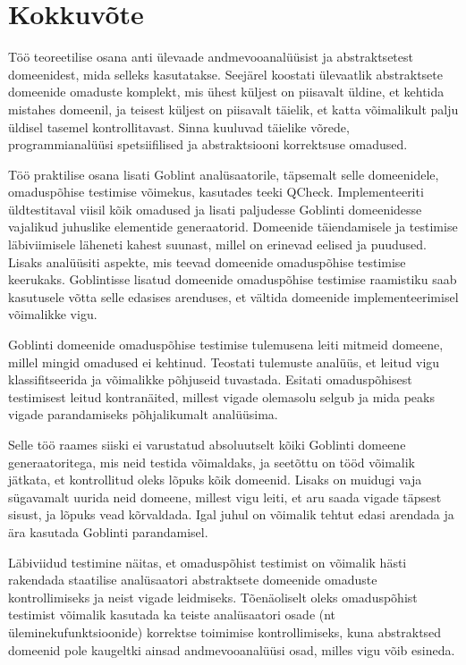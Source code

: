 \documentclass[../thesis.tex]{subfiles}
\begin{document}
\section{Kokkuvõte}
Töö teoreetilise osana anti ülevaade andmevooanalüüsist ja abstraktsetest domeenidest, mida selleks kasutatakse. Seejärel koostati ülevaatlik abstraktsete domeenide omaduste komplekt, mis ühest küljest on piisavalt üldine, et kehtida mistahes domeenil, ja teisest küljest on piisavalt täielik, et katta võimalikult palju üldisel tasemel kontrollitavast. Sinna kuuluvad täielike võrede, programmianalüüsi spetsiifilised ja abstraktsiooni korrektsuse omadused.

Töö praktilise osana lisati Goblint analüsaatorile, täpsemalt selle domeenidele, omaduspõhise testimise võimekus, kasutades teeki QCheck. Implementeeriti üldtestitaval viisil kõik omadused ja lisati paljudesse Goblinti domeenidesse vajalikud juhuslike elementide generaatorid. Domeenide täiendamisele ja testimise läbiviimisele läheneti kahest suunast, millel on erinevad eelised ja puudused. Lisaks analüüsiti aspekte, mis teevad domeenide omaduspõhise testimise keerukaks. Goblintisse lisatud domeenide omaduspõhise testimise raamistiku saab kasutusele võtta selle edasises arenduses, et vältida domeenide implementeerimisel võimalikke vigu.

Goblinti domeenide omaduspõhise testimise tulemusena leiti mitmeid domeene, millel mingid omadused ei kehtinud. Teostati tulemuste analüüs, et leitud vigu klassifitseerida ja võimalikke põhjuseid tuvastada. Esitati omaduspõhisest testimisest leitud kontranäited, millest vigade olemasolu selgub ja mida peaks vigade parandamiseks põhjalikumalt analüüsima.

Selle töö raames siiski ei varustatud absoluutselt kõiki Goblinti domeene generaatoritega, mis neid testida võimaldaks, ja seetõttu on tööd võimalik jätkata, et kontrollitud oleks lõpuks kõik domeenid. Lisaks on muidugi vaja sügavamalt uurida neid domeene, millest vigu leiti, et aru saada vigade täpsest sisust, ja lõpuks vead kõrvaldada. Igal juhul on võimalik tehtut edasi arendada ja ära kasutada Goblinti parandamisel.

Läbiviidud testimine näitas, et omaduspõhist testimist on võimalik hästi rakendada staatilise analüsaatori abstraktsete domeenide omaduste kontrollimiseks ja neist vigade leidmiseks. Tõenäoliselt oleks omaduspõhist testimist võimalik kasutada ka teiste analüsaatori osade (nt üleminekufunktsioonide) korrektse toimimise kontrollimiseks, kuna abstraktsed domeenid pole kaugeltki ainsad andmevooanalüüsi osad, milles vigu võib esineda.
\end{document}
